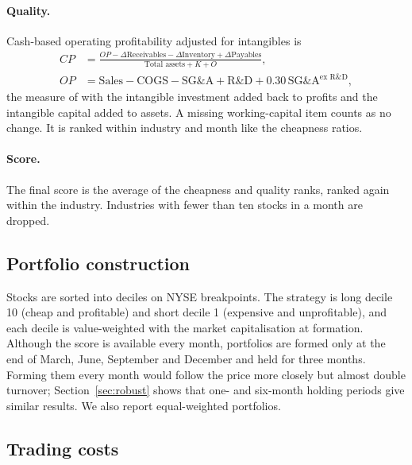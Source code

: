 \documentclass[12pt,a4paper]{article}
\begin{document}
\paragraph{Quality.} Cash-based operating profitability adjusted for intangibles is
\begin{align}
CP &= \frac{OP - \Delta\text{Receivables} - \Delta\text{Inventory} + \Delta\text{Payables}}
{\text{Total assets} + K + O}, \\
OP &= \text{Sales} - \text{COGS} - \text{SG\&A} + \text{R\&D} + 0.30\,\text{SG\&A}^{\text{ex R\&D}},
\end{align}
the measure of \citet{BallGerakosLinnainmaaNikolaev2016} with the intangible investment added back to
profits and the intangible capital added to assets. A missing working-capital item counts as no
change. It is ranked within industry and month like the cheapness ratios.

\paragraph{Score.} The final score is the average of the cheapness and quality ranks, ranked again
within the industry. Industries with fewer than ten stocks in a month are dropped.

\subsection{Portfolio construction}

Stocks are sorted into deciles on NYSE breakpoints. The strategy is long decile 10 (cheap and
profitable) and short decile 1 (expensive and unprofitable), and each decile is value-weighted with
the market capitalisation at formation. Although the score is available every month, portfolios are
formed only at the end of March, June, September and December and held for three months. Forming
them every month would follow the price more closely but almost double turnover;
Section~\ref{sec:robust} shows that one- and six-month holding periods give similar results. We also
report equal-weighted portfolios.

\subsection{Trading costs}
\end{document}
